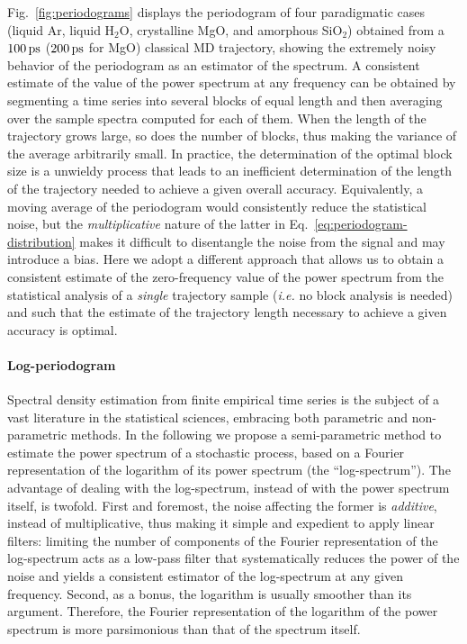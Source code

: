 Fig.~\ref{fig:periodograms} displays the periodogram of four paradigmatic cases (liquid Ar, liquid H$_2$O, crystalline MgO, and amorphous SiO$_2$) obtained from a $100\,\mathrm{ps}$ ($200\,\mathrm{ps}$ for MgO) classical MD trajectory, showing the extremely noisy behavior of the periodogram as an estimator of the spectrum. 
A consistent estimate of the value of the power spectrum at any frequency can be obtained by segmenting a time series into several blocks of equal length and then averaging over the sample spectra computed for each of them. When the length of the trajectory grows large, so does the number of blocks, thus making the variance of the average arbitrarily small. In practice, the determination of the optimal block size is a unwieldy process that leads to an inefficient determination of the length of the trajectory needed to achieve a given overall accuracy. 
Equivalently, a moving average \cite{MovingAverage} of the periodogram would consistently reduce the statistical noise, but the \emph{multiplicative} nature of the latter in Eq.~\eqref{eq:periodogram-distribution} makes it difficult to disentangle the noise from the signal and may introduce a bias. 
Here we adopt a different approach that allows us to obtain a consistent estimate of the zero-frequency value of the power spectrum from the statistical analysis of a \emph{single} trajectory sample (\emph{i.e.} no block analysis is needed) and such that the estimate of the trajectory length necessary to achieve a given accuracy is optimal.

\paragraph{Log-periodogram}
Spectral density estimation from finite empirical time series is the subject of a vast literature in the statistical sciences, embracing both parametric and non-parametric methods.\cite{Stoica2005} In the following we propose a semi-parametric method to estimate the power spectrum of a stochastic process, based on a Fourier representation of the logarithm of its power spectrum (the ``log-spectrum''). The advantage of dealing with the log-spectrum, instead of with the power spectrum itself, is twofold. First and foremost, the noise affecting the former is \emph{additive}, instead of multiplicative, thus making it simple and expedient to apply linear filters: limiting the number of components of the Fourier representation of the log-spectrum acts as a low-pass filter that systematically reduces the power of the noise and yields a consistent estimator of the log-spectrum at any given frequency. Second, as a bonus, the logarithm is usually smoother than its argument. Therefore, the Fourier representation of the logarithm of the power spectrum is more parsimonious than that of the spectrum itself.

